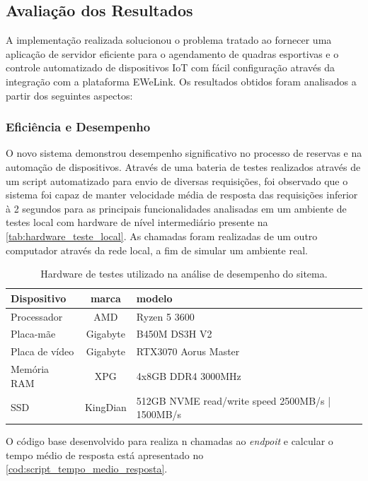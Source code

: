 \subsection{Avaliação dos Resultados}

A implementação realizada solucionou o problema tratado ao fornecer uma aplicação de servidor eficiente para o agendamento de quadras esportivas e o controle automatizado de dispositivos IoT com fácil configuração através da integração com a plataforma EWeLink. Os resultados obtidos foram analisados a partir dos seguintes aspectos:

\subsubsection{Eficiência e Desempenho}

O novo sistema demonstrou desempenho significativo no processo de reservas e na automação de dispositivos. Através de uma bateria de testes realizados através de um script automatizado para envio de diversas requisições, foi observado que o sistema foi capaz de manter velocidade média de resposta das requisições inferior à 2 segundos para as principais funcionalidades analisadas em um ambiente de testes local com hardware de nível intermediário presente na \autoref{tab:hardware_teste_local}. As chamadas foram realizadas de um outro computador através da rede local, a fim de simular um ambiente real.

\begin{table}[htb]
	\centering
	\caption{\label{tab:hardware_teste_local}Hardware de testes utilizado na análise de desempenho do sitema.}	
	\begin{tabular}{|l|c|p{6cm}|}
		\hline
		\textbf{Dispositivo} & \textbf{marca} & \textbf{modelo} \\ \hline
    Processador & AMD & Ryzen 5 3600 \\ \hline
    Placa-mãe & Gigabyte & B450M DS3H V2 \\ \hline
    Placa de vídeo & Gigabyte & RTX3070 Aorus Master \\ \hline
    Memória RAM & XPG & 4x8GB DDR4 3000MHz \\ \hline
    SSD & KingDian & 512GB NVME read/write speed 2500MB/s | 1500MB/s\\ \hline
	\end{tabular}
\end{table}

O código base desenvolvido para realiza n chamadas ao \textit{endpoit} e calcular o tempo médio de resposta está apresentado no \autoref{cod:script_tempo_medio_resposta}.

